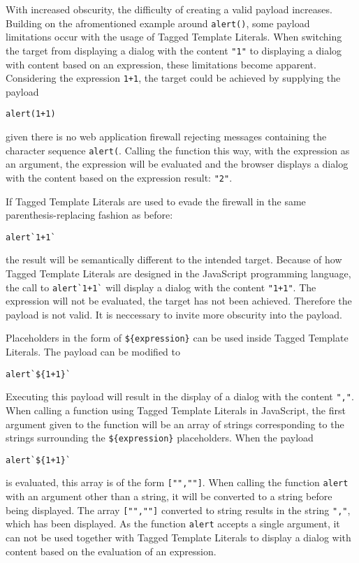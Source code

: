 With increased obscurity, the difficulty of creating a valid payload increases. Building on the afromentioned example around \verb|alert()|, some payload limitations occur with the usage of Tagged Template Literals. When switching the target from displaying a dialog with the content \verb|"1"| to displaying a dialog with content based on an expression, these limitations become apparent. Considering the expression \verb|1+1|, the target could be achieved by supplying the payload
\begin{lstlisting}[style=basicStyle]
alert(1+1)
\end{lstlisting}
given there is no web application firewall rejecting messages containing the character sequence \verb|alert(|. Calling the function this way, with the expression as an argument, the expression will be evaluated and the browser displays a dialog with the content based on the expression result: \verb|"2"|.

If Tagged Template Literals are used to evade the firewall in the same parenthesis-replacing fashion as before: 
\begin{lstlisting}[style=basicStyle]
alert`1+1`
\end{lstlisting}
the result will be semantically different to the intended target.
Because of how Tagged Template Literals are designed in the JavaScript programming language, the call to \verb|alert`1+1`| will display a dialog with the content \verb|"1+1"|. The expression will not be evaluated, the target has not been achieved. Therefore the payload is not valid. It is neccessary to invite more obscurity into the payload. 

Placeholders in the form of \verb|${expression}| can be used inside Tagged Template Literals. The payload can be modified to 
\begin{lstlisting}[style=basicStyle]
alert`${1+1}`
\end{lstlisting}
Executing this payload will result in the display of a dialog with the content \verb|","|. When calling a function using Tagged Template Literals in JavaScript, the first argument given to the function will be an array of strings corresponding to the strings surrounding the \verb|${expression}| placeholders. 
When the payload
\begin{lstlisting}[style=basicStyle]
alert`${1+1}`
\end{lstlisting}
is evaluated, this array is of the form \verb|["",""]|. When calling the function \verb|alert| with an argument other than a string, it will be converted to a string before being displayed. The array \verb|["",""]| converted to string results in the string \verb|","|, which has been displayed. 
As the function \verb|alert| accepts a single argument, it can not be used together with Tagged Template Literals to display a dialog with content based on the evaluation of an expression.

